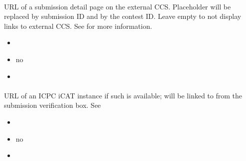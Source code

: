 \documentclass[a4paper,10pt,english,openany]{sphinxmanual}
\begin{document}
\paragraph{}
\label{\detokenize{configuration-reference:external-ccs-submission-url}}
\sphinxAtStartPar
URL of a submission detail page on the external CCS. Placeholder \sphinxtitleref{{[}id{]}} will be replaced by submission ID and \sphinxtitleref{{[}contest{]}} by the contest ID. Leave empty to not display links to external CCS. See {\hyperref[\detokenize{shadow::doc}]{}} for more information.
\begin{itemize}
\item {} 
\sphinxAtStartPar
{} 

\item {} 
\sphinxAtStartPar
{} no

\item {} 
\sphinxAtStartPar
{} \sphinxcode{\sphinxupquote{\textquotesingle{}\textquotesingle{}}}

\end{itemize}


\paragraph{}
\label{\detokenize{configuration-reference:icat-url}}
\sphinxAtStartPar
URL of an ICPC iCAT instance if such is available; will be linked to from the submission verification box. See 
\begin{itemize}
\item {} 
\sphinxAtStartPar
{} 

\item {} 
\sphinxAtStartPar
{} no

\item {} 
\sphinxAtStartPar
{} \sphinxcode{\sphinxupquote{\textquotesingle{}\textquotesingle{}}}

\end{itemize}
\end{document}
